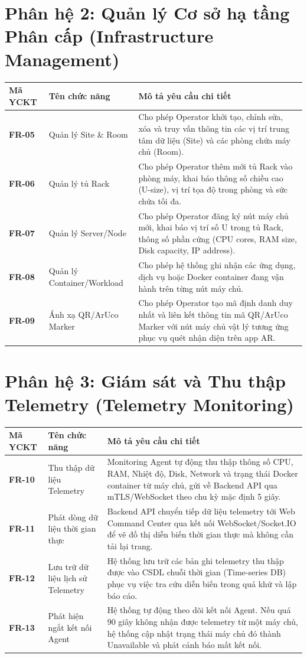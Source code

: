 \section{Phân hệ 2: Quản lý Cơ sở hạ tầng Phân cấp (Infrastructure Management)}
\begin{longtable}{|p{2.5cm}|p{4cm}|p{8cm}|}
\hline
\textbf{Mã YCKT} & \textbf{Tên chức năng} & \textbf{Mô tả yêu cầu chi tiết} \\ \hline
\endhead
\textbf{FR-05} & Quản lý Site \& Room & Cho phép Operator khởi tạo, chỉnh sửa, xóa và truy vấn thông tin các vị trí trung tâm dữ liệu (Site) và các phòng chứa máy chủ (Room). \\ \hline
\textbf{FR-06} & Quản lý tủ Rack & Cho phép Operator thêm mới tủ Rack vào phòng máy, khai báo thông số chiều cao (U-size), vị trí tọa độ trong phòng và sức chứa tối đa. \\ \hline
\textbf{FR-07} & Quản lý Server/Node & Cho phép Operator đăng ký nút máy chủ mới, khai báo vị trí số U trong tủ Rack, thông số phần cứng (CPU cores, RAM size, Disk capacity, IP address). \\ \hline
\textbf{FR-08} & Quản lý Container/Workload & Cho phép hệ thống ghi nhận các ứng dụng, dịch vụ hoặc Docker container đang vận hành trên từng nút máy chủ. \\ \hline
\textbf{FR-09} & Ánh xạ QR/ArUco Marker & Cho phép Operator tạo mã định danh duy nhất và liên kết thông tin mã QR/ArUco Marker với nút máy chủ vật lý tương ứng phục vụ quét nhận diện trên app AR. \\ \hline
\end{longtable}

\section{Phân hệ 3: Giám sát và Thu thập Telemetry (Telemetry Monitoring)}
\begin{longtable}{|p{2.5cm}|p{4cm}|p{8cm}|}
\hline
\textbf{Mã YCKT} & \textbf{Tên chức năng} & \textbf{Mô tả yêu cầu chi tiết} \\ \hline
\endhead
\textbf{FR-10} & Thu thập dữ liệu Telemetry & Monitoring Agent tự động thu thập thông số CPU, RAM, Nhiệt độ, Disk, Network và trạng thái Docker container từ máy chủ, gửi về Backend API qua mTLS/WebSocket theo chu kỳ mặc định 5 giây. \\ \hline
\textbf{FR-11} & Phát dòng dữ liệu thời gian thực & Backend API chuyển tiếp dữ liệu telemetry tới Web Command Center qua kết nối WebSocket/Socket.IO để vẽ đồ thị diễn biến thời gian thực mà không cần tải lại trang. \\ \hline
\textbf{FR-12} & Lưu trữ dữ liệu lịch sử Telemetry & Hệ thống lưu trữ các bản ghi telemetry thu thập được vào CSDL chuỗi thời gian (Time-series DB) phục vụ việc tra cứu diễn biến trong quá khứ và lập báo cáo. \\ \hline
\textbf{FR-13} & Phát hiện ngắt kết nối Agent & Hệ thống tự động theo dõi kết nối Agent. Nếu quá 90 giây không nhận được telemetry từ một máy chủ, hệ thống cập nhật trạng thái máy chủ đó thành Unavailable và phát cảnh báo mất kết nối. \\ \hline
\end{longtable}


